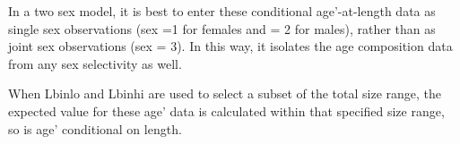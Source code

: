 In a two sex model, it is best to enter these conditional age’-at-length data as single sex observations (sex =1 for females and = 2 for males), rather than as joint sex observations (sex = 3).  In this way, it isolates the age composition data from any sex selectivity as well.

When Lbin\textunderscore lo and Lbin\textunderscore hi are used to select a subset of the total size range, the expected value for these age’ data is calculated within that specified size range, so is age’ conditional on length.



